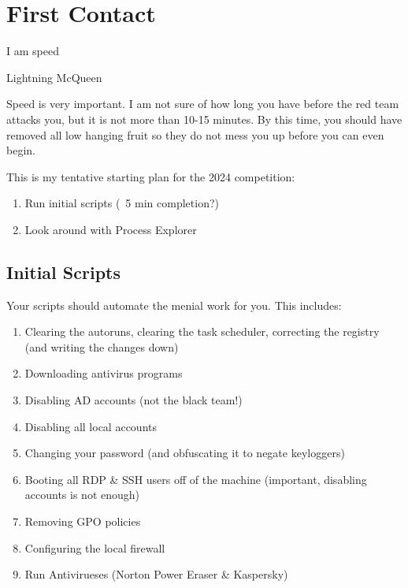 \documentclass{article}
\begin{document}
\section{First Contact}
\epigraph{I am speed}{Lightning McQueen}

Speed is very important. I am not sure of how long you have before the red team attacks you, but it is not more than 10-15 minutes.
By this time, you should have removed all low hanging fruit so they do not mess you up before you can even begin.

This is my tentative starting plan for the 2024 competition:
\begin{enumerate}
        \item Run initial scripts (~5 min completion?)
        \item Look around with Process Explorer
\end{enumerate}

\subsection{Initial Scripts}
Your scripts should automate the menial work for you. This includes:
\begin{enumerate}
        \item Clearing the autoruns, clearing the task scheduler, correcting the registry (and writing the changes down)
        \item Downloading antivirus programs
        \item Disabling AD accounts (not the black team!)
        \item Disabling all local accounts
        \item Changing your password (and obfuscating it to negate keyloggers)
        \item Booting all RDP \& SSH users off of the machine (important, disabling accounts is not enough)
        \item Removing GPO policies
        \item Configuring the local firewall
        \item Run Antivirueses (Norton Power Eraser \& Kaspersky)
\end{enumerate}
\end{document}
